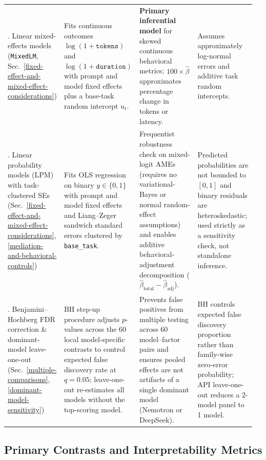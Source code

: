 \documentclass[a4paper,fleqn]{cas-sc}
\begin{document}
\begin{table}[htbp]
\begin{tabular}{@{}p{0.19\linewidth}p{0.27\linewidth}p{0.26\linewidth}p{0.24\linewidth}@{}}
\addlinespace[3pt]
3. Linear mixed-effects models (\texttt{MixedLM}, Sec.~\ref{fixed-effect-and-mixed-effect-considerations}) & Fits continuous outcomes $\log(1 + \texttt{tokens})$ and $\log(1 + \texttt{duration})$ with prompt and model fixed effects plus a base-task random intercept $u_t$. & \textbf{Primary inferential model} for skewed continuous behavioral metrics; $100 \times \hat{\beta}$ approximates percentage change in tokens or latency. & Assumes approximately log-normal errors and additive task random intercepts. \\
\addlinespace[3pt]
4. Linear probability models (LPM) with task-clustered SEs (Sec.~\ref{fixed-effect-and-mixed-effect-considerations}, \ref{mediation-and-behavioral-controls}) & Fits OLS regression on binary $y \in \{0,1\}$ with prompt and model fixed effects and Liang--Zeger sandwich standard errors clustered by \texttt{base\_task}. & Frequentist robustness check on mixed-logit AMEs (requires no variational-Bayes or normal random-effect assumptions) and enables additive behavioral-adjustment decomposition ($\hat{\beta}_{\text{total}} - \hat{\beta}_{\text{adj}}$). & Predicted probabilities are not bounded to $[0, 1]$ and binary residuals are heteroskedastic; used strictly as a sensitivity check, not standalone inference. \\
\addlinespace[3pt]
5. Benjamini--Hochberg FDR correction \& dominant-model leave-one-out (Sec.~\ref{multiple-comparisons}, \ref{dominant-model-sensitivity}) & BH step-up procedure adjusts $p$-values across the 60 local model-specific contrasts to control expected false discovery rate at $q=0.05$; leave-one-out re-estimates all models without the top-scoring model. & Prevents false positives from multiple testing across 60 model--factor pairs and ensures pooled effects are not artifacts of a single dominant model (Nemotron or DeepSeek). & BH controls expected false discovery proportion rather than family-wise zero-error probability; API leave-one-out reduces a 2-model panel to 1 model. \\
\bottomrule
\end{tabular}
\end{table}

\subsection{Primary Contrasts and Interpretability Metrics}\label{primary-contrasts}
\end{document}
